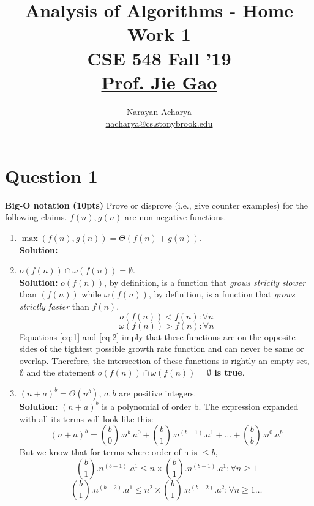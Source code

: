 \documentclass[11pt]{article}
\title{%
	Analysis of Algorithms - Home Work 1\\[2mm]
	\large CSE 548 Fall '19\\[1mm]
	\href{mailto:jgao@cs.stonybrook.edu}{Prof. Jie Gao}
}
\author{%
	Narayan Acharya \\[1mm] \small \href{mailto:nacharya@cs.stonybrook.edu}{nacharya@cs.stonybrook.edu
	}
}
\date{\vspace{-5ex}}
\begin{document}
\maketitle
\thispagestyle{fancy} %

\section{Question 1}

\textbf{Big-O notation (10pts)} Prove or disprove (i.e., give counter examples) for the following claims. $f(n), g(n)$ are non-negative functions.
    \begin{enumerate}
    \item $\max(f(n), g(n))=\Theta(f(n)+g(n))$. \\
    \textbf{Solution:}
    
    \item $o(f(n)) \cap \omega(f(n))=\emptyset$. \\
    \textbf{Solution:} $o(f(n))$, by definition, is a function that \textit{grows strictly slower} than $(f(n))$ while $\omega(f(n))$, by definition, is a function that \textit{grows strictly faster} than $f(n)$.
    \begin{equation} \label{eq:1}
    	o(f(n)) < f(n) : \forall n
    \end{equation} 
    \begin{equation} \label{eq:2}
	    \omega(f(n)) > f(n) : \forall n
    \end{equation}
	Equations \ref{eq:1} and \ref{eq:2} imply that these functions are on the opposite sides of the tightest possible growth rate function and can never be same or overlap. Therefore, the intersection of these functions is rightly an empty set, $\emptyset$ and the statement \textbf{$o(f(n)) \cap \omega(f(n))=\emptyset$ is true}.
    
    \item $(n+a)^b=\Theta(n^b)$, $a, b$ are positive integers. \\
    \textbf{Solution:} $(n+a)^b$ is a polynomial of order b. The expression expanded with all its terms will look like this:
	\begin{equation} \label{eq:3}
		  (n+a)^b = {b \choose 0}.n^{b}.a^0 + {b \choose 1}.n^{(b-1)}.a^1 + \ldots + {b \choose b}.n^{0}.a^b
	\end{equation}
	But we know that for terms where order of n is $ \le b$,
	\begin{equation} \label{eq:4}
	  {b \choose 1}.n^{(b-1)}.a^1 \leq n \times {b \choose 1}.n^{(b-1)}.a^1 : \forall n \geq 1
	\end{equation}
	\begin{equation} \label{eq:5}
		{b \choose 1}.n^{(b-2)}.a^1 \leq n^{2} \times {b \choose 1}.n^{(b-2)}.a^2 : \forall n \geq 1 \ldots
	\end{equation}
		

\end{enumerate}
\end{document}
